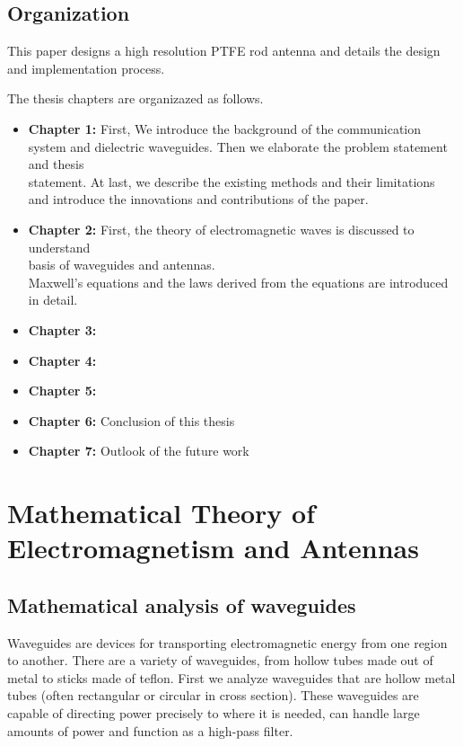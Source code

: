 \documentclass[a4paper,12pt]{report}
\begin{document}
\section{Organization}

This paper designs a high resolution PTFE rod antenna
and details the design and implementation process.

The thesis chapters are organizazed as follows.

\begin{itemize}
  \item[] \textbf{Chapter 1:} First, We introduce the background of the communication \\
  system and dielectric waveguides. Then we elaborate the problem statement and thesis \\
  statement. At last, we describe the existing methods and their limitations \\
  and introduce the innovations and contributions of the paper.
  \item[] \textbf{Chapter 2:} First, the theory of electromagnetic waves is discussed to understand \\
  basis of waveguides and antennas. \\
  Maxwell's equations and the laws derived from the equations are introduced in detail.
  \item[] \textbf{Chapter 3:} %
  \item[] \textbf{Chapter 4:}
  \item[] \textbf{Chapter 5:}
  \item[] \textbf{Chapter 6:} Conclusion of this thesis
  \item[] \textbf{Chapter 7:} Outlook of the future work
\end{itemize}


\chapter{Mathematical Theory of Electromagnetism and Antennas }

\section{Mathematical analysis of waveguides}

Waveguides are devices for transporting electromagnetic energy
from one region to another.
There are a variety of waveguides, from hollow tubes made out of metal to
sticks made of teflon.
First we analyze waveguides that are hollow metal tubes
(often rectangular or circular in cross section).
These waveguides are capable of directing power precisely to where it is needed,
can handle large amounts of power and function as a high-pass filter.
\end{document}

